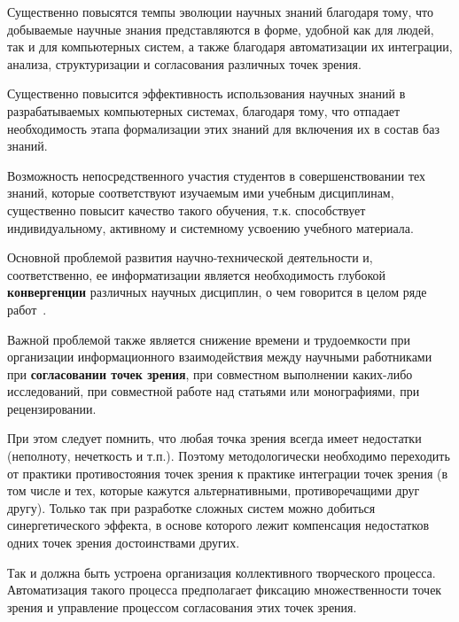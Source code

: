 \begin{SCn}
{\begin{scnitemize}
    \item Существенно повысятся темпы эволюции научных знаний благодаря тому, что добываемые научные знания представляются в форме, удобной как для людей, так и для компьютерных систем, а также благодаря автоматизации их интеграции, анализа, структуризации и согласования различных точек зрения. 
    \item Существенно повысится эффективность использования научных знаний в разрабатываемых компьютерных системах, благодаря тому, что отпадает необходимость этапа формализации этих знаний для включения их в состав баз знаний.
    \item Возможность непосредственного участия студентов в совершенствовании тех знаний, которые соответствуют изучаемым ими учебным дисциплинам, существенно повысит качество такого обучения, т.к. способствует индивидуальному, активному и системному усвоению учебного материала.
\end{scnitemize}

Основной проблемой развития научно-технической деятельности и, соответственно, ее информатизации является необходимость глубокой \textbf{конвергенции} различных научных дисциплин, о чем говорится в целом ряде работ~\cite{Palagin, Yankovskaya}.

Важной проблемой также является снижение времени и трудоемкости при организации информационного взаимодействия между научными работниками при \textbf{согласовании точек зрения}, при совместном выполнении каких-либо исследований, при совместной работе над статьями или монографиями, при рецензировании. 

При этом следует помнить, что любая точка зрения всегда имеет недостатки (неполноту, нечеткость и т.п.). Поэтому методологически необходимо переходить от практики противостояния точек зрения к практике интеграции точек зрения (в том числе и тех, которые кажутся альтернативными, противоречащими друг другу). Только так при разработке сложных систем можно добиться синергетического эффекта, в основе которого лежит компенсация недостатков одних точек зрения достоинствами других.

Так и должна быть устроена организация коллективного творческого процесса. Автоматизация такого процесса предполагает фиксацию множественности точек зрения и управление процессом согласования этих точек зрения.\\}
\end{SCn}
